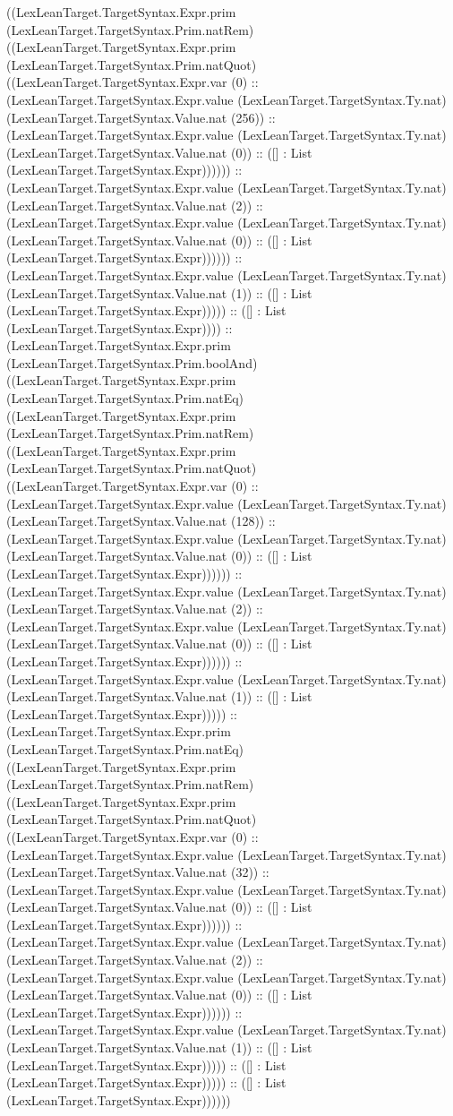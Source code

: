 \documentclass[11pt]{article}
\begin{document}
((LexLeanTarget.TargetSyntax.Expr.prim (LexLeanTarget.TargetSyntax.Prim.natRem) ((LexLeanTarget.TargetSyntax.Expr.prim (LexLeanTarget.TargetSyntax.Prim.natQuot) ((LexLeanTarget.TargetSyntax.Expr.var (0) :: (LexLeanTarget.TargetSyntax.Expr.value (LexLeanTarget.TargetSyntax.Ty.nat) (LexLeanTarget.TargetSyntax.Value.nat (256)) :: (LexLeanTarget.TargetSyntax.Expr.value (LexLeanTarget.TargetSyntax.Ty.nat) (LexLeanTarget.TargetSyntax.Value.nat (0)) :: ([] : List (LexLeanTarget.TargetSyntax.Expr)))))) :: (LexLeanTarget.TargetSyntax.Expr.value (LexLeanTarget.TargetSyntax.Ty.nat) (LexLeanTarget.TargetSyntax.Value.nat (2)) :: (LexLeanTarget.TargetSyntax.Expr.value (LexLeanTarget.TargetSyntax.Ty.nat) (LexLeanTarget.TargetSyntax.Value.nat (0)) :: ([] : List (LexLeanTarget.TargetSyntax.Expr)))))) :: (LexLeanTarget.TargetSyntax.Expr.value (LexLeanTarget.TargetSyntax.Ty.nat) (LexLeanTarget.TargetSyntax.Value.nat (1)) :: ([] : List (LexLeanTarget.TargetSyntax.Expr))))) :: ([] : List (LexLeanTarget.TargetSyntax.Expr)))) :: (LexLeanTarget.TargetSyntax.Expr.prim (LexLeanTarget.TargetSyntax.Prim.boolAnd) ((LexLeanTarget.TargetSyntax.Expr.prim (LexLeanTarget.TargetSyntax.Prim.natEq) ((LexLeanTarget.TargetSyntax.Expr.prim (LexLeanTarget.TargetSyntax.Prim.natRem) ((LexLeanTarget.TargetSyntax.Expr.prim (LexLeanTarget.TargetSyntax.Prim.natQuot) ((LexLeanTarget.TargetSyntax.Expr.var (0) :: (LexLeanTarget.TargetSyntax.Expr.value (LexLeanTarget.TargetSyntax.Ty.nat) (LexLeanTarget.TargetSyntax.Value.nat (128)) :: (LexLeanTarget.TargetSyntax.Expr.value (LexLeanTarget.TargetSyntax.Ty.nat) (LexLeanTarget.TargetSyntax.Value.nat (0)) :: ([] : List (LexLeanTarget.TargetSyntax.Expr)))))) :: (LexLeanTarget.TargetSyntax.Expr.value (LexLeanTarget.TargetSyntax.Ty.nat) (LexLeanTarget.TargetSyntax.Value.nat (2)) :: (LexLeanTarget.TargetSyntax.Expr.value (LexLeanTarget.TargetSyntax.Ty.nat) (LexLeanTarget.TargetSyntax.Value.nat (0)) :: ([] : List (LexLeanTarget.TargetSyntax.Expr)))))) :: (LexLeanTarget.TargetSyntax.Expr.value (LexLeanTarget.TargetSyntax.Ty.nat) (LexLeanTarget.TargetSyntax.Value.nat (1)) :: ([] : List (LexLeanTarget.TargetSyntax.Expr))))) :: (LexLeanTarget.TargetSyntax.Expr.prim (LexLeanTarget.TargetSyntax.Prim.natEq) ((LexLeanTarget.TargetSyntax.Expr.prim (LexLeanTarget.TargetSyntax.Prim.natRem) ((LexLeanTarget.TargetSyntax.Expr.prim (LexLeanTarget.TargetSyntax.Prim.natQuot) ((LexLeanTarget.TargetSyntax.Expr.var (0) :: (LexLeanTarget.TargetSyntax.Expr.value (LexLeanTarget.TargetSyntax.Ty.nat) (LexLeanTarget.TargetSyntax.Value.nat (32)) :: (LexLeanTarget.TargetSyntax.Expr.value (LexLeanTarget.TargetSyntax.Ty.nat) (LexLeanTarget.TargetSyntax.Value.nat (0)) :: ([] : List (LexLeanTarget.TargetSyntax.Expr)))))) :: (LexLeanTarget.TargetSyntax.Expr.value (LexLeanTarget.TargetSyntax.Ty.nat) (LexLeanTarget.TargetSyntax.Value.nat (2)) :: (LexLeanTarget.TargetSyntax.Expr.value (LexLeanTarget.TargetSyntax.Ty.nat) (LexLeanTarget.TargetSyntax.Value.nat (0)) :: ([] : List (LexLeanTarget.TargetSyntax.Expr)))))) :: (LexLeanTarget.TargetSyntax.Expr.value (LexLeanTarget.TargetSyntax.Ty.nat) (LexLeanTarget.TargetSyntax.Value.nat (1)) :: ([] : List (LexLeanTarget.TargetSyntax.Expr))))) :: ([] : List (LexLeanTarget.TargetSyntax.Expr))))) :: ([] : List (LexLeanTarget.TargetSyntax.Expr)))))) 
\end{document}

